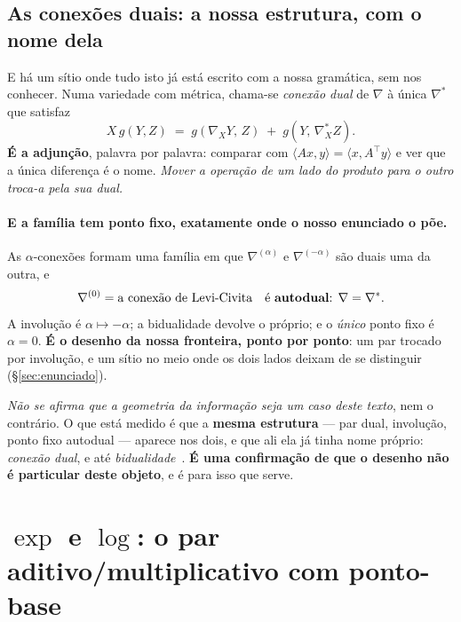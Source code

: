 \documentclass[livro.tex]{subfiles}
\begin{document}
\subsection{As conexões duais: a nossa estrutura, com o nome dela}\label{sec:geoamari}

E há um sítio onde tudo isto já está escrito com a nossa gramática, sem nos conhecer. Numa
variedade com métrica, chama-se \emph{conexão dual} de $\nabla$ à única $\nabla^{*}$ que
satisfaz~\cite{amari-nagaoka}
\[
  X\,g(Y,Z) \;=\; g(\nabla_{X}Y,\,Z) \;+\; g(Y,\,\nabla^{*}_{X}Z) .
\]
\textbf{É a adjunção}, palavra por palavra: comparar com
$\langle Ax,y\rangle=\langle x,A^{\top}y\rangle$ e ver que a única diferença é o nome. \emph{Mover a
operação de um lado do produto para o outro troca-a pela sua dual.}

\paragraph{E a família tem ponto fixo, exatamente onde o nosso enunciado o põe.} As
$\alpha$-conexões formam uma família em que $\nabla^{(\alpha)}$ e $\nabla^{(-\alpha)}$ são duais uma
da outra, e
\[
  \nabla^{(0)} = \text{a conexão de Levi-Civita} \quad\text{é \textbf{autodual}: } \nabla=\nabla^{*} .
\]
A involução é $\alpha\mapsto-\alpha$; a bidualidade devolve o próprio; e o \emph{único} ponto fixo é
$\alpha=0$. \textbf{É o desenho da nossa fronteira, ponto por ponto}: um par trocado por involução,
e um sítio no meio onde os dois lados deixam de se distinguir (\S\ref{sec:enunciado}).


\begin{obs}
\emph{Não se afirma que a geometria da informação seja um caso deste texto}, nem o contrário. O que
está medido é que a \textbf{mesma estrutura} --- par dual, involução, ponto fixo autodual --- aparece
nos dois, e que ali ela já tinha nome próprio: \emph{conexão dual}, e até
\emph{bidualidade}~\cite{amari-nagaoka}. \textbf{É uma confirmação de que o desenho não é
particular deste objeto}, e é para isso que serve.
\end{obs}

\section{\texorpdfstring{$\exp$ e $\log$}{exp e log}: o par aditivo/multiplicativo com ponto-base}\label{sec:geoexplog}
\end{document}
